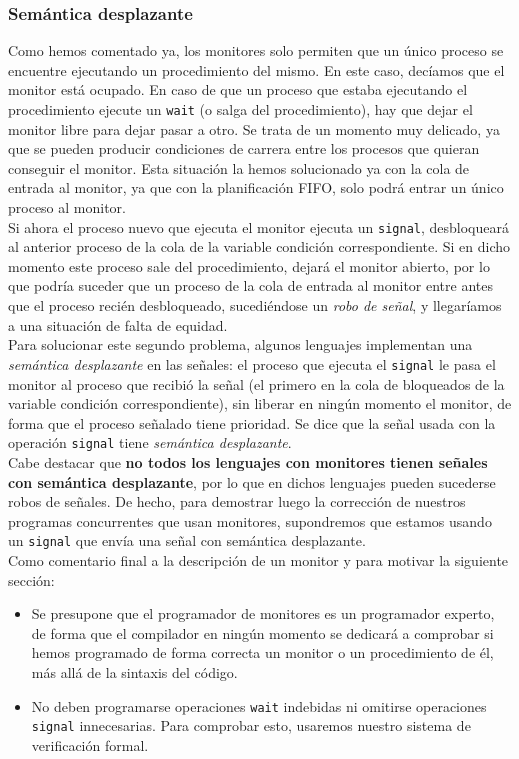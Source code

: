 \subsubsection{Semántica desplazante}
Como hemos comentado ya, los monitores solo permiten que un único proceso se encuentre ejecutando un procedimiento del mismo. En este caso, decíamos que el monitor está ocupado. En caso de que un proceso que estaba ejecutando el procedimiento ejecute un \verb|wait| (o salga del procedimiento), hay que dejar el monitor libre para dejar pasar a otro. Se trata de un momento muy delicado, ya que se pueden producir condiciones de carrera entre los procesos que quieran conseguir el monitor. Esta situación la hemos solucionado ya con la cola de entrada al monitor, ya que con la planificación FIFO, solo podrá entrar un único proceso al monitor.\\

Si ahora el proceso nuevo que ejecuta el monitor ejecuta un \verb|signal|, desbloqueará al anterior proceso de la cola de la variable condición correspondiente. Si en dicho momento este proceso sale del procedimiento, dejará el monitor abierto, por lo que podría suceder que un proceso de la cola de entrada al monitor entre antes que el proceso recién desbloqueado, sucediéndose un \emph{robo de señal}, y llegaríamos a una situación de falta de equidad.\\

Para solucionar este segundo problema, algunos lenguajes implementan una \emph{semántica desplazante} en las señales: el proceso que ejecuta el \verb|signal| le pasa el monitor al proceso que recibió la señal (el primero en la cola de bloqueados de la variable condición correspondiente), sin liberar en ningún momento el monitor, de forma que el proceso señalado tiene prioridad. Se dice que la señal usada con la operación \verb|signal| tiene \emph{semántica desplazante}.\\

Cabe destacar que \textbf{no todos los lenguajes con monitores tienen señales con semántica desplazante}, por lo que en dichos lenguajes pueden sucederse robos de señales. De hecho, para demostrar luego la corrección de nuestros programas concurrentes que usan monitores, supondremos que estamos usando un \verb|signal| que envía una señal con semántica desplazante.\\

\noindent
Como comentario final a la descripción de un monitor y para motivar la siguiente sección:
\begin{itemize}
    \item Se presupone que el programador de monitores es un programador experto, de forma que el compilador en ningún momento se dedicará a comprobar si hemos programado de forma correcta un monitor o un procedimiento de él, más allá de la sintaxis del código.
    \item No deben programarse operaciones \verb|wait| indebidas ni omitirse operaciones \verb|signal| innecesarias. Para comprobar esto, usaremos nuestro sistema de verificación formal.
\end{itemize}

